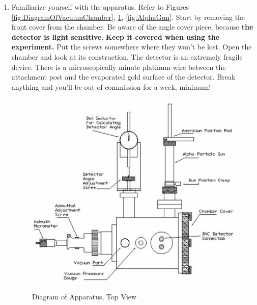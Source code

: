 \documentclass{../lab}
\begin{document}
\begin{enumerate}
    \item Familiarize yourself with the apparatus. Refer to Figures \ref{fig:DiagramOfVacuumChamber}, \ref{fig:DiagramOfApparatusTopView}, \ref{fig:AlphaGun}. Start by removing the front cover from the chamber. Be aware of the angle cover piece, because \textbf{the detector is light sensitive}. \textbf{Keep it covered when using the experiment.} Put the screws somewhere where they won't be lost. Open the chamber and look at its construction. The detector is an extremely fragile device. There is a microscopically minute platinum wire between the attachment post and the evaporated gold surface of the detector. Break anything and you'll be out of commission for a week, minimum!
   
    \begin{figure}[h]
    \captionsetup{justification=centering}
    \begin{minipage}{0.49\linewidth}
        \href{http://experimentationlab.berkeley.edu/sites/default/files/images/RUT13.jpg}{\includegraphics[height=0.8\linewidth]{images/RUT13.jpg}}
        \caption{Diagram of Apparatus, Top View}
        \label{fig:DiagramOfApparatusTopView}
    \end{minipage} \hfill
        \begin{minipage}{0.49\linewidth}

\end{minipage}
\end{figure}
\end{enumerate}
\end{document}
